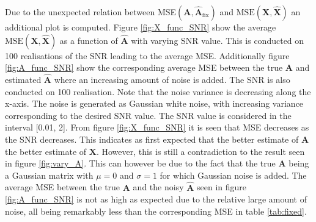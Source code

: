 Due to the unexpected relation between MSE$(\mathbf{A}, \hat{\mathbf{A}}_{\text{fix}})$ and $\text{MSE}(\mathbf{X}, \hat{\mathbf{X}})$ an additional plot is computed. Figure \ref{fig:X_func_SNR} show the average $\text{MSE}(\mathbf{X}, \hat{\mathbf{X}})$ as a function of $\hat{\textbf{A}}$ with varying SNR value. This is conducted on 100 realisations of the SNR leading to the average MSE.
Additionally figure \ref{fig:A_func_SNR} show the corresponding average MSE between the true $\textbf{A}$ and estimated $\hat{\textbf{A}}$ where an increasing amount of noise is added. The SNR is also conducted on 100 realisation.
Note that the noise variance is decreasing along the x-axis. 
The noise is generated as Gaussian white noise, with increasing variance corresponding to the desired SNR value. The SNR value is considered in the interval [0.01, 2]. 
From figure \ref{fig:X_func_SNR} it is seen that MSE decreases as the SNR decreases. This indicates as first expected that the better estimate of $\textbf{A}$ the better estimate of $\textbf{X}$. However, this is still a contradiction to the result seen in figure \ref{fig:vary_A}. 
This can however be due to the fact that the true $\textbf{A}$ being a Gaussian matrix with $\mu = 0$ and $\sigma = 1$ for which Gaussian noise is added. The average MSE between the true $\textbf{A}$ and the noisy $\hat{\textbf{A}}$ seen in figure \ref{fig:A_func_SNR} is not as high as expected due to the relative large amount of noise, all being remarkably less than the corresponding MSE in table \ref{tab:fixed}.  

